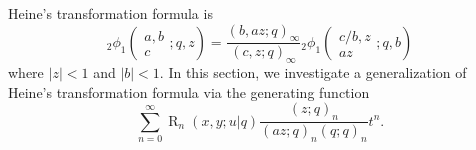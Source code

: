 \documentclass{cimart}
\DeclareMathOperator{\opR}{R}
\begin{document}
Heine's transformation formula is
\begin{equation}\label{eqn_heine}
    {}_{2}\phi_{1}\left(
        \begin{array}{c}
             a,b \\
             c
        \end{array};
        q,z
        \right)=\frac{(b,az;q)_{\infty}}{(c,z;q)_{\infty}}{}_{2}\phi_{1}\left(
        \begin{array}{c}
             c/b,z \\
             az
        \end{array};
        q,b
        \right)
\end{equation}
where $\vert z\vert<1$ and $\vert b\vert<1$. In this section, we investigate a generalization of Heine's transformation formula via the generating function
\begin{equation*}
    \sum_{n=0}^{\infty}\opR_{n}(x,y;u|q)\frac{(z;q)_{n}}{(az;q)_{n}(q;q)_{n}}t^n.
\end{equation*}
\end{document}
